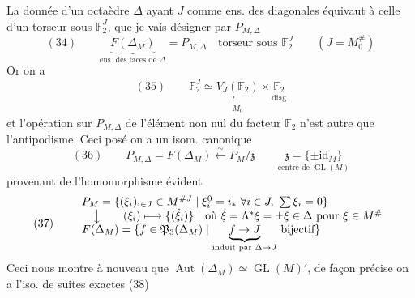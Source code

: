 \documentclass[11pt,a4paper]{article}
\begin{document}
La donnée d'un octaèdre $\Delta$ ayant $J$ comme ens. des diagonales équivaut à celle d'un torseur
sous $\mathbb{F}_2^J$, que je vais désigner par $P_{M,\Delta}$
\[
  (34) \qquad \underset{\text{ens. des faces de } \Delta}{\underbrace{F(\Delta_M)}} = P_{M,\Delta} \quad \text{torseur sous } \mathbb{F}_2^J \qquad (J = M_0^{\#})
\]
Or on a
\[
  (35) \qquad \mathbb{F}_2^J \simeq \underset{\substack{\wr\\ M_0}}{V_J(\mathbb{F}_2)} \times \underset{\text{diag}}{\mathbb{F}_2}
\]
et l'opération sur $P_{M,\Delta}$ de l'élément non nul \struck{\ill{}} du facteur $\mathbb{F}_2$ n'est autre que l'antipodisme. Ceci posé on a un isom. canonique
\[
  (36) \qquad P_{M,\Delta} = F(\Delta_M) \xleftarrow{\;\sim\;} P_M/\mathfrak{z} \qquad \underset{\text{centre de } \operatorname{GL}(M)}{\mathfrak{z} = \{\pm \mathrm{id}_M\}}
\]
provenant de l'homomorphisme évident
\[
  (37) \qquad
  \begin{array}{l}
    P_M = \{ (\xi_i)_{i \in J} \in M^{\# J} \mid \xi_i^0 = i_* \ \forall i \in J,\ \sum \xi_i = 0 \} \\
    \quad \big\downarrow \qquad (\xi_i) \longmapsto \{(\dot\xi_i)\} \quad \text{où } \dot\xi = \Lambda^* \xi = \pm \xi \in \Delta \text{ pour } \xi \in M^{\#} \\
    F(\Delta_M) = \{ f \in \mathfrak{P}_3(\Delta_M) \mid \underset{\text{induit par } \Delta \to J}{\underbrace{f \to J}} \text{ bijectif} \}
  \end{array}
\]
Ceci nous montre à nouveau que $\operatorname{Aut}(\Delta_M) \simeq \operatorname{GL}(M)'$, de façon précise on a l'iso. de suites exactes
(38)



\end{document}
